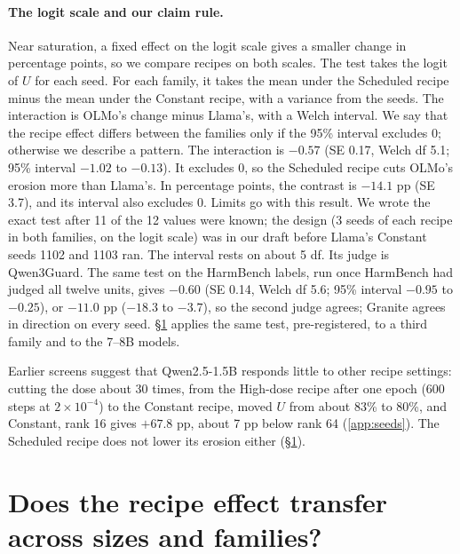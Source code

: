 \documentclass{article}
\begin{document}
\paragraph{The logit scale and our claim rule.} Near saturation, a fixed effect on
the logit scale gives a smaller change in percentage points, so we compare
recipes on both scales. The test takes the logit of $U$ for each seed. For each family, it takes the mean under the Scheduled recipe minus the
mean under the Constant recipe, with a variance from the seeds. The interaction
is OLMo's change minus Llama's, with a Welch interval. We say that the recipe
effect differs between the families only if the 95\% interval excludes 0;
otherwise we describe a pattern. The interaction is $-0.57$ (SE 0.17, Welch df
5.1; 95\% interval $-1.02$ to $-0.13$). It excludes 0, so the Scheduled recipe
cuts OLMo's erosion more than Llama's. In percentage points, the contrast is
$-14.1$ pp (SE 3.7), and its interval also excludes 0. Limits go with this
result. We wrote the exact test after 11 of the 12 values were known; the design
(3 seeds of each recipe in both families, on the logit scale) was in our draft
before Llama's Constant seeds 1102 and 1103 ran. The interval rests on about 5
df. Its judge is Qwen3Guard. The same test on the HarmBench labels, run once
HarmBench had judged all twelve units, gives $-0.60$ (SE 0.14, Welch df 5.6;
95\% interval $-0.95$ to $-0.25$), or $-11.0$ pp ($-18.3$ to $-3.7$), so the
second judge agrees; Granite agrees in direction on every seed.
\S\ref{sec:transfer} applies the same test, pre-registered, to a third family
and to the 7--8B models.

Earlier screens suggest that Qwen2.5-1.5B responds little to other recipe
settings: cutting the dose about 30 times, from the High-dose recipe after one
epoch (600 steps at $2 \times 10^{-4}$) to the Constant recipe, moved $U$ from
about 83\% to 80\%, and Constant, rank 16 gives $+67.8$ pp, about 7 pp below
rank 64 (\cref{app:seeds}). The Scheduled recipe does not lower its erosion
either (\S\ref{sec:transfer}).

\section{Does the recipe effect transfer across sizes and families?}
\label{sec:transfer}
\end{document}
